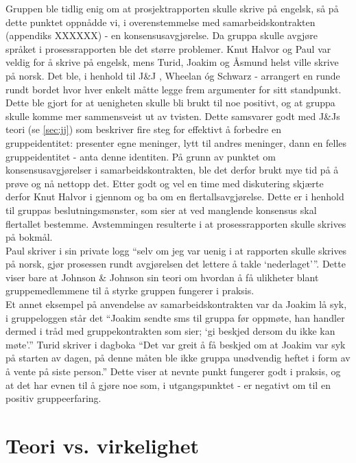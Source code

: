 Gruppen ble tidlig enig om at prosjektrapporten skulle skrive på engelsk, så på
dette punktet oppnådde vi, i overenstemmelse med samarbeidskontrakten (appendiks
XXXXXX) - en konsensusavgjørelse. Da gruppa skulle avgjøre språket i
prosessrapporten ble det større problemer. Knut Halvor og Paul var veldig for å
skrive på engelsk, mens Turid, Joakim og Åsmund helst ville skrive på norsk. Det
ble, i henhold til J\&J \cite{jj}, Wheelan \cite{wheelan} óg Schwarz
\cite{schwarz} - arrangert en runde rundt bordet hvor hver enkelt måtte legge
frem argumenter for sitt standpunkt. Dette ble gjort for at uenigheten skulle
bli brukt til noe positivt, og at gruppa skulle komme mer sammensveist ut av
tvisten. Dette samsvarer godt med J\&Js teori (se \cref{sec:jj}) som beskriver
fire steg for effektivt å forbedre en gruppeidentitet: presenter egne meninger,
lytt til andres meninger, dann en felles gruppeidentitet - anta denne identiten.
På grunn av punktet om konsensusavgjørelser i samarbeidskontrakten, ble det
derfor brukt mye tid på å prøve og nå nettopp det. Etter godt og vel en time med
diskutering skjærte derfor Knut Halvor i gjennom og ba om en
flertallsavgjørelse. Dette er i henhold til gruppas beslutningsmønster, som sier
at ved manglende konsensus skal flertallet bestemme. Avstemmingen resulterte i
at prosessrapporten skulle skrives på bokmål. \\

Paul skriver i sin private logg ``selv om jeg var uenig i at rapporten skulle
skrives på norsk, gjør prosessen rundt avgjørelsen det lettere å takle
`nederlaget'''. Dette viser bare at Johnson \& Johnson sin teori \cite{jj} om
hvordan å få ulikheter blant gruppemedlemmene til å styrke gruppen fungerer i
praksis. \\

Et annet eksempel på anvendelse av samarbeidskontrakten var da Joakim lå syk, i
gruppeloggen står det ``Joakim sendte sms til gruppa før oppmøte, han handler
dermed i tråd med gruppekontrakten som sier; `gi beskjed dersom du ikke kan
møte'.'' Turid skriver i dagboka ``Det var greit å få beskjed om at Joakim var
syk på starten av dagen, på denne måten ble ikke gruppa unødvendig heftet i form
av å vente på siste person.'' Dette viser at nevnte punkt fungerer godt i
praksis, og at det har evnen til å gjøre noe som, i utgangspunktet - er negativt
om til en positiv gruppeerfaring.

\section{Teori vs. virkelighet}


